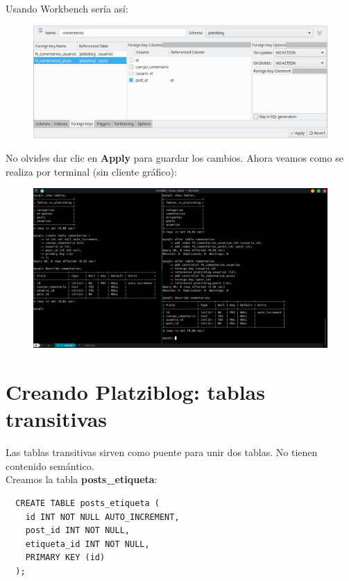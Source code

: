\documentclass{article}
\begin{document}
\newpage
Usando Workbench sería así:\\

\begin{figure}[h!]
  \centering
  \includegraphics[scale=0.55]{./Pictures/072_fk_comentarios.png}
\end{figure}

No olvides dar clic en \textbf{Apply} para guardar los cambios. Ahora veamos
como se realiza por terminal (sin cliente gráfico):\\

\begin{figure}[h!]
  \centering
  \includegraphics[scale=0.5]{./Pictures/154_platziblog_t_dependientes.png}
\end{figure}


\section{Creando Platziblog: tablas transitivas}%
Las tablas transitivas sirven como puente para unir dos tablas. No tienen
contenido semántico.\\

Creamos la tabla \textbf{posts\_etiqueta}:

\begin{verbatim}
  CREATE TABLE posts_etiqueta (
    id INT NOT NULL AUTO_INCREMENT,
    post_id INT NOT NULL,
    etiqueta_id INT NOT NULL,
    PRIMARY KEY (id)
  );
\end{verbatim}
\end{document}
